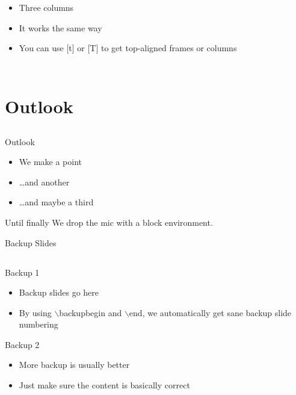 \documentclass[aspectratio=169]{beamer}
\begin{document}
\begin{frame}
\begin{columns}[T]
    \begin{itemize}
      \item Three columns
      \item It works the same way
      \item You can use [t] or [T] to get top-aligned frames or columns
    \end{itemize}
  \end{columns}
\end{frame}

\section{Outlook}
\subsection{}

\begin{frame}
  {Outlook}
  \begin{itemize}
    \item We make a point
    \item \ldots and another
    \item \ldots and maybe a third
  \end{itemize}
  \vspace{2em}
  \begin{block}{Until finally}
    \centering
    We drop the mic with a block environment.
  \end{block}
\end{frame}

\backupbegin

\begin{frame}
  {}
  \begin{center}
    \Huge Backup Slides
  \end{center}
\end{frame}

\subsection{}

\begin{frame}
  {Backup 1}
  \begin{itemize}
    \item Backup slides go here
    \item By using $\backslash$backupbegin and $\backslash$end, we
      automatically get sane backup slide numbering
  \end{itemize}
\end{frame}

\begin{frame}
  {Backup 2}
  \begin{itemize}
    \item More backup is usually better
    \item Just make sure the content is basically correct
  \end{itemize}
\end{frame}

\backupend
\end{document}
